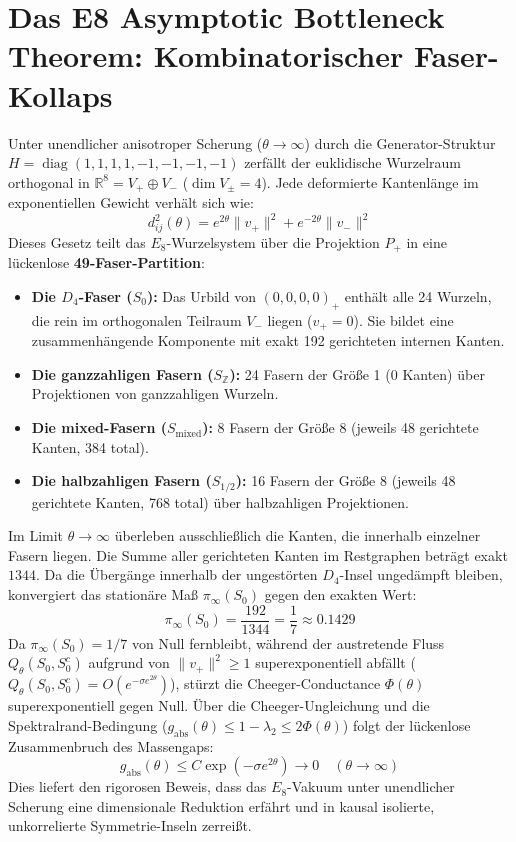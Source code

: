 \documentclass[11pt,a4paper]{article}
\begin{document}
	\section{Das E8 Asymptotic Bottleneck Theorem: Kombinatorischer Faser-Kollaps}
	Unter unendlicher anisotroper Scherung ($\theta \to \infty$) durch die Generator-Struktur $H = \operatorname{diag}(1,1,1,1,-1,-1,-1,-1)$ zerfällt der euklidische Wurzelraum orthogonal in $\mathbb{R}^8 = V_+ \oplus V_-$ ($\dim V_\pm = 4$). Jede deformierte Kantenlänge im exponentiellen Gewicht verhält sich wie:
	\begin{equation}
		d_{ij}^2(\theta) = e^{2\theta} \|v_+\|^2 + e^{-2\theta} \|v_-\|^2
	\end{equation}
	Dieses Gesetz teilt das $E_8$-Wurzelsystem über die Projektion $P_+$ in eine lückenlose \textbf{49-Faser-Partition}:
	\begin{itemize}
		\item \textbf{Die $D_4$-Faser ($S_0$):} Das Urbild von $(0,0,0,0)_+$ enthält alle 24 Wurzeln, die rein im orthogonalen Teilraum $V_-$ liegen ($v_+ = 0$). Sie bildet eine zusammenhängende Komponente mit exakt 192 gerichteten internen Kanten.
		\item \textbf{Die ganzzahligen Fasern ($S_{\mathbb{Z}}$):} 24 Fasern der Größe 1 (0 Kanten) über Projektionen von ganzzahligen Wurzeln.
		\item \textbf{Die mixed-Fasern ($S_{\text{mixed}}$):} 8 Fasern der Größe 8 (jeweils 48 gerichtete Kanten, 384 total).
		\item \textbf{Die halbzahligen Fasern ($S_{1/2}$):} 16 Fasern der Größe 8 (jeweils 48 gerichtete Kanten, 768 total) über halbzahligen Projektionen.
	\end{itemize}
	Im Limit $\theta \to \infty$ überleben ausschließlich die Kanten, die innerhalb einzelner Fasern liegen. Die Summe aller gerichteten Kanten im Restgraphen beträgt exakt $1344$. Da die Übergänge innerhalb der ungestörten $D_4$-Insel ungedämpft bleiben, konvergiert das stationäre Maß $\pi_\infty(S_0)$ gegen den exakten Wert:
	\begin{equation}
		\pi_\infty(S_0) = \frac{192}{1344} = \frac{1}{7} \approx 0.1429
	\end{equation}
	Da $\pi_\infty(S_0) = 1/7$ von Null fernbleibt, während der austretende Fluss $Q_\theta(S_0, S_0^c)$ aufgrund von $\|v_+\|^2 \ge 1$ superexponentiell abfällt ($Q_\theta(S_0, S_0^c) = O(e^{-\sigma e^{2\theta}})$), stürzt die Cheeger-Conductance $\Phi(\theta)$ superexponentiell gegen Null. Über die Cheeger-Ungleichung und die Spektralrand-Bedingung ($g_{\text{abs}}(\theta) \le 1 - \lambda_2 \le 2\Phi(\theta)$) folgt der lückenlose Zusammenbruch des Massengaps:
	\begin{equation}
		g_{\text{abs}}(\theta) \le C \exp\left(-\sigma e^{2\theta}\right) \longrightarrow 0 \quad (\theta \to \infty)
	\end{equation}
	Dies liefert den rigorosen Beweis, dass das $E_8$-Vakuum unter unendlicher Scherung eine dimensionale Reduktion erfährt und in kausal isolierte, unkorrelierte Symmetrie-Inseln zerreißt.
	
\end{document}
